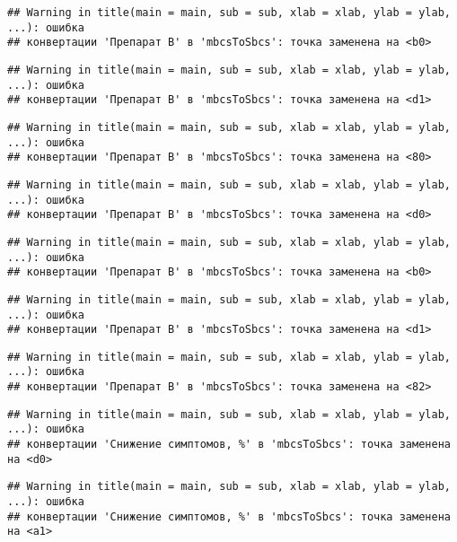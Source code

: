 \documentclass[
]{article}
\begin{document}
\begin{verbatim}
## Warning in title(main = main, sub = sub, xlab = xlab, ylab = ylab, ...): ошибка
## конвертации 'Препарат B' в 'mbcsToSbcs': точка заменена на <b0>
\end{verbatim}

\begin{verbatim}
## Warning in title(main = main, sub = sub, xlab = xlab, ylab = ylab, ...): ошибка
## конвертации 'Препарат B' в 'mbcsToSbcs': точка заменена на <d1>
\end{verbatim}

\begin{verbatim}
## Warning in title(main = main, sub = sub, xlab = xlab, ylab = ylab, ...): ошибка
## конвертации 'Препарат B' в 'mbcsToSbcs': точка заменена на <80>
\end{verbatim}

\begin{verbatim}
## Warning in title(main = main, sub = sub, xlab = xlab, ylab = ylab, ...): ошибка
## конвертации 'Препарат B' в 'mbcsToSbcs': точка заменена на <d0>
\end{verbatim}

\begin{verbatim}
## Warning in title(main = main, sub = sub, xlab = xlab, ylab = ylab, ...): ошибка
## конвертации 'Препарат B' в 'mbcsToSbcs': точка заменена на <b0>
\end{verbatim}

\begin{verbatim}
## Warning in title(main = main, sub = sub, xlab = xlab, ylab = ylab, ...): ошибка
## конвертации 'Препарат B' в 'mbcsToSbcs': точка заменена на <d1>
\end{verbatim}

\begin{verbatim}
## Warning in title(main = main, sub = sub, xlab = xlab, ylab = ylab, ...): ошибка
## конвертации 'Препарат B' в 'mbcsToSbcs': точка заменена на <82>
\end{verbatim}

\begin{verbatim}
## Warning in title(main = main, sub = sub, xlab = xlab, ylab = ylab, ...): ошибка
## конвертации 'Снижение симптомов, %' в 'mbcsToSbcs': точка заменена на <d0>
\end{verbatim}

\begin{verbatim}
## Warning in title(main = main, sub = sub, xlab = xlab, ylab = ylab, ...): ошибка
## конвертации 'Снижение симптомов, %' в 'mbcsToSbcs': точка заменена на <a1>
\end{verbatim}
\end{document}
